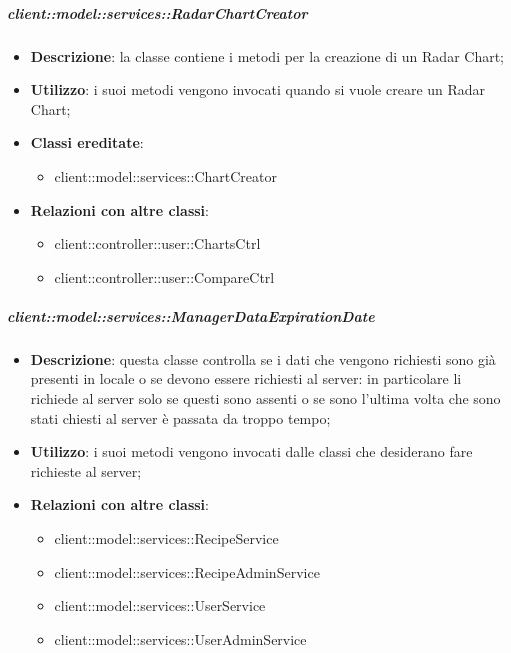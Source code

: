 		\subparagraph{client::model::services::RadarChartCreator} %
		\label{subp:radarchartcreator}
			\begin{itemize}
				\item \textbf{Descrizione}: la classe contiene i metodi per la creazione di un Radar Chart;
				\item \textbf{Utilizzo}: i suoi metodi vengono invocati quando si vuole creare un Radar Chart;
				\item \textbf{Classi ereditate}:
					\begin{itemize}
						\item client::model::services::ChartCreator
					\end{itemize}
				\item \textbf{Relazioni con altre classi}:
					\begin{itemize}
						\item client::controller::user::ChartsCtrl
						\item client::controller::user::CompareCtrl
					\end{itemize}
			\end{itemize}

		\subparagraph{client::model::services::ManagerDataExpirationDate} %
		\label{subp:radarchartcreator}
			\begin{itemize}
				\item \textbf{Descrizione}: questa classe controlla se i dati che vengono richiesti sono già presenti in locale o se devono essere richiesti al server: in particolare li richiede al server solo se questi sono assenti o se sono l'ultima volta che sono stati chiesti al server è passata da troppo tempo;
				\item \textbf{Utilizzo}: i suoi metodi vengono invocati dalle classi che desiderano fare richieste al server;
				\item \textbf{Relazioni con altre classi}:
					\begin{itemize}
						\item client::model::services::RecipeService
						\item client::model::services::RecipeAdminService
						\item client::model::services::UserService
						\item client::model::services::UserAdminService
					\end{itemize}
			\end{itemize}

